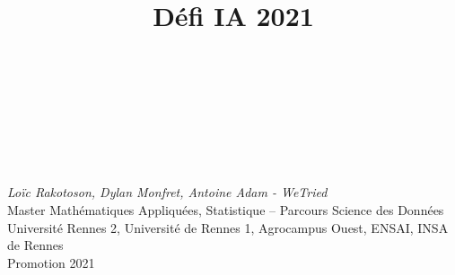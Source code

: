 

\title{Défi IA 2021}


\begin{minipage}{0.4\textwidth}
\maketitle

\hfill\\
\hfill\\
\hfill\\
\hfill\\
\hfill\\
		\begin{flushleft} \large
			\emph{Loïc Rakotoson, Dylan Monfret, Antoine Adam - WeTried}\\
			Master Mathématiques Appliquées, Statistique – Parcours Science des Données\\
            		Université Rennes 2, Université de Rennes 1, Agrocampus Ouest, ENSAI, INSA de Rennes \\
            		Promotion 2021\\
			\end{flushleft}
			\end{minipage}~

